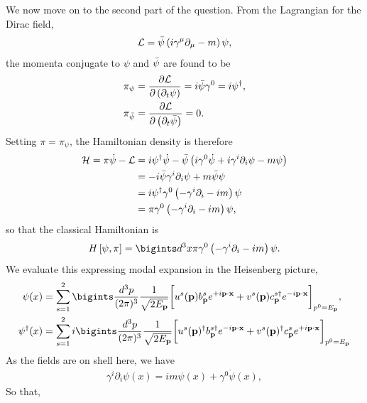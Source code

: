 We now move on to the second part of the question. From the Lagrangian for the Dirac field,
\begin{align}
    \mathcal{L}=\Bar{\psi}\left(i\gamma^\mu\partial_\mu-m\right)\psi,
\end{align}
the momenta conjugate to $\psi$ and $\Bar{\psi}$ are found to be
\begin{align}
    \pi_\psi&=\frac{\partial\mathcal{L}}{\partial\left(\partial_t\psi\right)}=i\Bar{\psi}\gamma^0=i\psi^\dagger,\\
    \pi_{\Bar{\psi}}&=\frac{\partial\mathcal{L}}{\partial\left(\partial_t\Bar{\psi}\right)}=0.
\end{align}
Setting $\pi=\pi_\psi$, the Hamiltonian density is therefore
\begin{align}
    \mathcal{H}=\pi\Dot{\psi}-\mathcal{L}&=i\psi^\dagger\Dot{\psi}-\Bar{\psi}\left(i\gamma^0\Dot{\psi}+i\gamma^i\partial_i\psi-m\psi\right)\notag\\
    &=-i\Bar{\psi}\gamma^i\partial_i\psi+m\Bar{\psi}\psi\notag\\
    &=i\psi^\dagger\gamma^0\left(-\gamma^i\partial_i-im\right)\psi\notag\\
    &=\pi\gamma^0\left(-\gamma^i\partial_i-im\right)\psi,
\end{align}
so that the classical Hamiltonian is
\begin{align}
    H\left[\psi,\pi\right]=\bigints d^3x\pi\gamma^0\left(-\gamma^i\partial_i-im\right)\psi.
\end{align}
We evaluate this expressing modal expansion in the Heisenberg picture,
\begin{align*}
    \psi(x)&=\sum_{s=1}^2\bigints\frac{d^3p}{(2\pi)^3}\frac{1}{\sqrt{2E_\mathbf{p}}}\bigg[u^s(\mathbf{p})b_\mathbf{p}^se^{+i\mathbf{p}\cdot\mathbf{x}}+v^s(\mathbf{p})c_\mathbf{p}^{s\dagger}e^{-i\mathbf{p}\cdot\mathbf{x}}\bigg]_{p^0=E_\mathbf{p}},\\
    \psi^\dagger(x)&=\sum_{s=1}^2i\bigints\frac{d^3p}{(2\pi)^3}\frac{1}{\sqrt{2E_\mathbf{p}}}\bigg[u^{s}(\mathbf{p})^\dagger b_\mathbf{p}^{s\dagger}e^{-i\mathbf{p}\cdot\mathbf{x}}+v^s(\mathbf{p})^\dagger c_\mathbf{p}^{s}e^{+i\mathbf{p}\cdot\mathbf{x}}\bigg]_{p^0=E_\mathbf{p}}
\end{align*}
As the fields are on shell here, we have
\begin{align}
    \gamma^i\partial_i\psi(x)=im\psi(x)+\gamma^0\Dot{\psi}(x),
\end{align}
So that,

